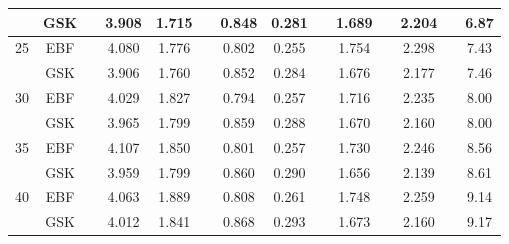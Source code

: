 \documentclass[aoas]{imsart}
\begin{document}
\begin{table}[htbp]
\begin{tabular}{cc c cc c cc c c c c c c}
	&	GSK	&&	3.908	&	1.715	&&	0.848	&	0.281	&&	1.689	&&	2.204	&&	6.87	\\
\midrule																	
25	&	EBF	&&	4.080	&	1.776	&&	0.802	&	0.255	&&	1.754	&&	2.298	&&	7.43	\\
	&	GSK	&&	3.906	&	1.760	&&	0.852	&	0.284	&&	1.676	&&	2.177	&&	7.46	\\
\midrule																	
30	&	EBF	&&	4.029	&	1.827	&&	0.794	&	0.257	&&	1.716	&&	2.235	&&	8.00	\\
	&	GSK	&&	3.965	&	1.799	&&	0.859	&	0.288	&&	1.670	&&	2.160	&&	8.00	\\
\midrule																	
35	&	EBF	&&	4.107	&	1.850	&&	0.801	&	0.257	&&	1.730	&&	2.246	&&	8.56	\\
	&	GSK	&&	3.959	&	1.799	&&	0.860	&	0.290	&&	1.656	&&	2.139	&&	8.61	\\
\midrule																	
40	&	EBF	&&	4.063	&	1.889	&&	0.808	&	0.261	&&	1.748	&&	2.259	&&	9.14	\\
	&	GSK	&&	4.012	&	1.841	&&	0.868	&	0.293	&&	1.673	&&	2.160	&&	9.17	\\
\bottomrule																	
  \end{tabular}
\end{table}
\end{document}
